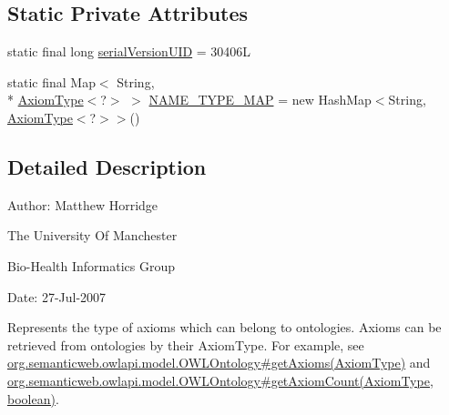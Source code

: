 \subsection*{Static Private Attributes}
\begin{DoxyCompactItemize}
\item 
static final long \hyperlink{classorg_1_1semanticweb_1_1owlapi_1_1model_1_1_axiom_type_3_01_c_01extends_01_o_w_l_axiom_01_4_acd185d359e84e54307b5e407d8fee454}{serial\-Version\-U\-I\-D} = 30406\-L
\item 
static final Map$<$ String, \\*
\hyperlink{classorg_1_1semanticweb_1_1owlapi_1_1model_1_1_axiom_type_3_01_c_01extends_01_o_w_l_axiom_01_4_af3ef15094af1800e34dd66f6289c3631}{Axiom\-Type}$<$?$>$ $>$ \hyperlink{classorg_1_1semanticweb_1_1owlapi_1_1model_1_1_axiom_type_3_01_c_01extends_01_o_w_l_axiom_01_4_ab7a2ac09583ebe246dcb5d0efd7f7490}{N\-A\-M\-E\-\_\-\-T\-Y\-P\-E\-\_\-\-M\-A\-P} = new Hash\-Map$<$String, \hyperlink{classorg_1_1semanticweb_1_1owlapi_1_1model_1_1_axiom_type_3_01_c_01extends_01_o_w_l_axiom_01_4_af3ef15094af1800e34dd66f6289c3631}{Axiom\-Type}$<$?$>$$>$()
\end{DoxyCompactItemize}


\subsection{Detailed Description}
Author\-: Matthew Horridge\par
 The University Of Manchester\par
 Bio-\/\-Health Informatics Group\par
 Date\-: 27-\/\-Jul-\/2007\par
\par
 

Represents the type of axioms which can belong to ontologies. Axioms can be retrieved from ontologies by their {\ttfamily Axiom\-Type}. For example, see \hyperlink{}{org.\-semanticweb.\-owlapi.\-model.\-O\-W\-L\-Ontology\#get\-Axioms(\-Axiom\-Type)} and \hyperlink{}{org.\-semanticweb.\-owlapi.\-model.\-O\-W\-L\-Ontology\#get\-Axiom\-Count(\-Axiom\-Type, boolean)}. 


